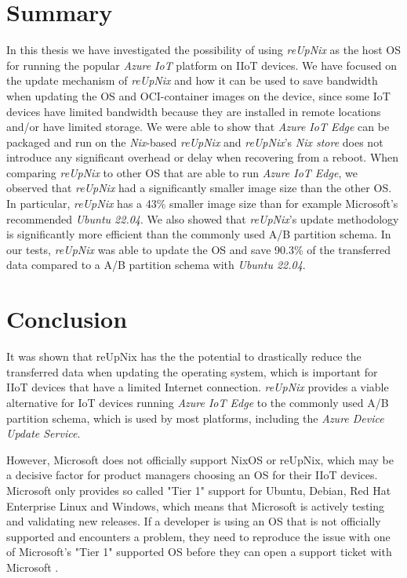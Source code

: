 \section{Summary}
In this thesis we have investigated the possibility of using \textit{reUpNix} as the
host \ac{OS} for running the popular \textit{Azure IoT} platform on \ac{IIoT} devices.
We have focused on the update mechanism of \textit{reUpNix} and how it can be used
to save bandwidth when updating the \ac{OS} and \ac{OCI}-container images on the device,
since some \ac{IoT} devices have limited bandwidth because they are installed in
remote locations and/or have limited storage. We were able to show that \textit{Azure IoT Edge}
can be packaged and run on the \textit{Nix}-based \textit{reUpNix} and
\textit{reUpNix}'s \textit{Nix store} does not introduce any significant overhead
or delay when recovering from a reboot. When comparing \textit{reUpNix} to
other \ac{OS} that are able to run \textit{Azure IoT Edge}, we observed that \textit{reUpNix}
had a significantly smaller image size than the other \ac{OS}. In particular,
\textit{reUpNix} has a 43\% smaller image size than for example Microsoft's
recommended \textit{Ubuntu 22.04}. We also showed that \textit{reUpNix}'s update
methodology is significantly more efficient than the commonly used A/B partition
schema. In our tests, \textit{reUpNix} was able to update the \ac{OS} and save
90.3\% of the transferred data compared to a A/B partition schema with \textit{Ubuntu 22.04}.


\section{Conclusion}
It was shown that reUpNix has the the potential to drastically reduce the transferred
data when updating the operating system, which is important for \ac{IIoT} devices
that have a limited Internet connection. \textit{reUpNix} provides a viable
alternative for \ac{IoT} devices running \textit{Azure IoT Edge}
to the commonly used A/B partition schema, which is used by most platforms,
including the \textit{Azure Device Update Service}.

However, Microsoft does not officially support NixOS or reUpNix, which may be a decisive factor
for product managers choosing an \ac{OS} for their \ac{IIoT} devices. Microsoft
only provides so called "Tier 1" support for Ubuntu, Debian, Red Hat Enterprise
Linux and Windows, which means that Microsoft is actively testing and validating
new releases. If a developer is using an \ac{OS} that is not officially supported
and encounters a problem, they need to reproduce the issue with one of Microsoft's
"Tier 1" supported \ac{OS} before they can open a support ticket with Microsoft
\cite{msdoc-supportetplatforms}.

